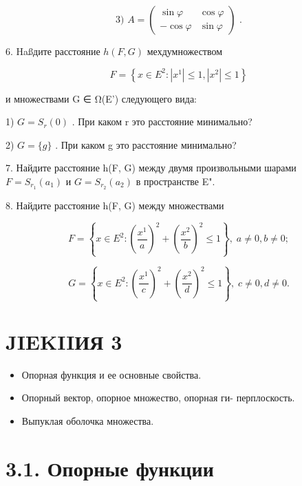 \documentclass[8pt]{extarticle}
\begin{document}
\[
\text{ 3) }A = \left( \begin{array}{rr} \sin \varphi & \cos \varphi \\   - \cos \varphi & \sin \varphi  \end{array}\right) \text{ . }
\]

6. Haßдите расстояние \(h\left( {F,G}\right)\) мехдумножеством

\[
F = \left\{  {x \in  {E}^{2} : \left| {x}^{1}\right|  \leq  1,\left| {x}^{2}\right|  \leq  1}\right\}
\]

и множествами G ∈ Ω(E’) следующего вида:

1) \(G = {S}_{r}\left( 0\right)\) . При каком r это расстояние минимально?

2) \(G = \{ g\}\) . При каком g это расстояние минимально?

7. Найдите расстояние h(F, G) между двумя произвольными шарами \(F = {S}_{{r}_{1}}\left( {a}_{1}\right)\) и \(G = {S}_{{r}_{2}}\left( {a}_{2}\right)\) в пространстве E".

8. Найдите расстояние h(F, G) между множествами

\[
F = \left\{  {x \in  {E}^{2} : {\left( \frac{{x}^{1}}{a}\right) }^{2} + {\left( \frac{{x}^{2}}{b}\right) }^{2} \leq  1}\right\}  ,\;a \neq  0,b \neq  0;
\]

\[
G = \left\{  {x \in  {E}^{2} : {\left( \frac{{x}^{1}}{c}\right) }^{2} + {\left( \frac{{x}^{2}}{d}\right) }^{2} \leq  1}\right\}  ,\;c \neq  0,d \neq  0.
\]

\section*{JIEKIIИЯ 3}

\begin{itemize}\relax
\item\relax Опорная функция и ее основные свойства.
\end{itemize}

\begin{itemize}\relax
\item\relax Опорный вектор, опорное множество, опорная ги- перплоскость.
\end{itemize}

\begin{itemize}\relax
\item\relax Выпуклая оболочка множества.
\end{itemize}

\section*{3.1. Опорные функции}
\end{document}
